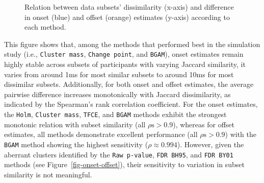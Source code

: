 \documentclass[
  doc,
  floatsintext,
  longtable,
  a4paper,
  nolmodern,
  notxfonts,
  notimes,
  colorlinks=true,linkcolor=blue,citecolor=blue,urlcolor=blue]{apa7}
\begin{document}
\begin{figure}[!htb]

\caption{\label{fig-splits-similarity}Relation between data subsets'
dissimilarity (x-axis) and difference in onset (blue) and offset
(orange) estimates (y-axis) according to each method.}


\end{figure}%

This figure shows that, among the methods that performed best in the
simulation study (i.e., \texttt{Cluster\ mass}, \texttt{Change\ point},
and \texttt{BGAM}), onset estimates remain highly stable across subsets
of participants with varying Jaccard similarity, it varies from around
1ms for most similar subsets to around 10ms for most dissimilar subsets.
Additionally, for both onset and offset estimates, the average pairwise
difference increases monotonically with Jaccard dissimilarity, as
indicated by the Spearman's rank correlation coefficient. For the onset
estimates, the \texttt{Holm}, \texttt{Cluster\ mass}, \texttt{TFCE}, and
\texttt{BGAM} methods exhibit the strongest monotonic relation with
subset similarity (all \(\rho\text{s} > 0.9\)), whereas for offset
estimates, all methods demonstrate excellent performance (all
\(\rho\text{s} > 0.9\)) with the \texttt{BGAM} method showing the
highest sensitivity (\(\rho\approx0.994\)). However, given the aberrant
clusters identified by the \texttt{Raw\ p-value}, \texttt{FDR\ BH95},
and \texttt{FDR\ BY01} methods (see Figure~\ref{fig-onset-offset}),
their sensitivity to variation in subset similarity is not meaningful.
\end{document}
